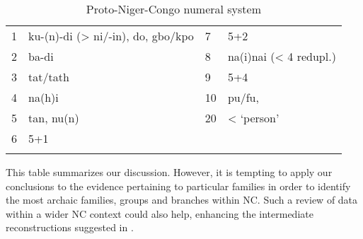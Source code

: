 \begin{table}
\caption{\label{tab:4:41}Proto-Niger-Congo numeral system}


\begin{tabularx}{\textwidth}{XlXl}
\lsptoprule

1 & ku-(n)-di (> ni/-in), do, gbo/kpo & 7 & 5+2\\
2 & ba-di & 8 & na(i)nai (< 4 redupl.)\\
3 & tat/tath & 9 & 5+4\\
4 & na(h)i & 10 & pu/fu, \\
5 & tan, nu(n) & 20 & < ‘person’\\
6 & 5+1 &  & \\
\lspbottomrule
\end{tabularx}
\end{table}
This table summarizes our discussion. However, it is tempting to apply our conclusions to the evidence pertaining to particular families in order to identify the most archaic families, groups and branches within NC. Such a review of data within a wider NC context could also help, enhancing the intermediate reconstructions suggested in .
